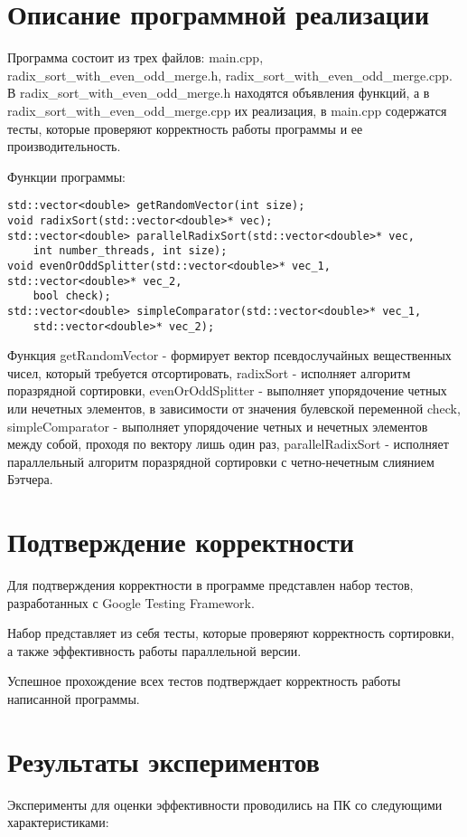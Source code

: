 \documentclass{report}
\begin{document}
\section*{Описание программной реализации}
Программа состоит из трех файлов: main.cpp, radix\_sort\_with\_even\_odd\_merge.h, radix\_sort\_with\_even\_odd\_merge.cpp. В radix\_sort\_with\_even\_odd\_merge.h находятся объявления функций, а в radix\_sort\_with\_even\_odd\_merge.cpp их реализация, в main.cpp содержатся тесты, которые проверяют корректность работы программы и ее производительность.
\par Функции программы:
\begin{lstlisting}
std::vector<double> getRandomVector(int size);
void radixSort(std::vector<double>* vec); 
std::vector<double> parallelRadixSort(std::vector<double>* vec,
    int number_threads, int size);
void evenOrOddSplitter(std::vector<double>* vec_1, std::vector<double>* vec_2,
    bool check);
std::vector<double> simpleComparator(std::vector<double>* vec_1,
    std::vector<double>* vec_2);
\end{lstlisting}
\par Функция getRandomVector - формирует вектор псевдослучайных вещественных чисел, который требуется отсортировать, radixSort - исполняет алгоритм поразрядной сортировки, evenOrOddSplitter - выполняет упорядочение четных или нечетных элементов, в зависимости от значения булевской переменной check,  simpleComparator - выполняет упорядочение четных и нечетных элементов между собой, проходя по вектору лишь один раз, parallelRadixSort - исполняет параллельный алгоритм поразрядной сортировки с четно-нечетным слиянием Бэтчера.
\newpage

\section*{Подтверждение корректности}
Для подтверждения корректности в программе представлен набор тестов, разработанных с Google Testing Framework.
\par Набор представляет из себя тесты, которые проверяют корректность сортировки, а также эффективность работы параллельной версии.
\par Успешное прохождение всех тестов подтверждает корректность работы написанной программы.
\newpage

\section*{Результаты экспериментов}
Эксперименты для оценки эффективности проводились на ПК со следующими характеристиками:
\end{document}
